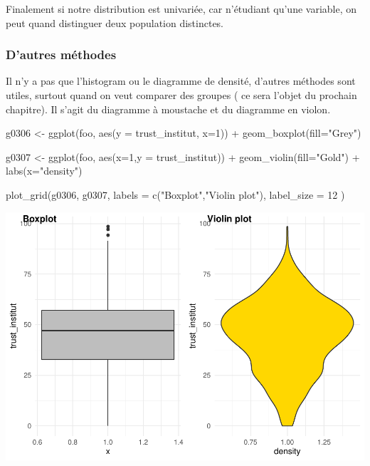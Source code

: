 \documentclass[
]{book}
\newenvironment{Shaded}{\begin{snugshade}}{\end{snugshade}}
\newcommand{\AttributeTok}[1]{\textcolor[rgb]{0.77,0.63,0.00}{#1}}
\newcommand{\DecValTok}[1]{\textcolor[rgb]{0.00,0.00,0.81}{#1}}
\newcommand{\FunctionTok}[1]{\textcolor[rgb]{0.00,0.00,0.00}{#1}}
\newcommand{\NormalTok}[1]{#1}
\newcommand{\OtherTok}[1]{\textcolor[rgb]{0.56,0.35,0.01}{#1}}
\newcommand{\SpecialCharTok}[1]{\textcolor[rgb]{0.00,0.00,0.00}{#1}}
\newcommand{\StringTok}[1]{\textcolor[rgb]{0.31,0.60,0.02}{#1}}
\begin{document}
Finalement si notre distribution est univariée, car n'étudiant qu'une variable, on peut quand distinguer deux population distinctes.

\hypertarget{dautres-muxe9thodes}{%
\subsubsection{D'autres méthodes}\label{dautres-muxe9thodes}}

Il n'y a pas que l'histogram ou le diagramme de densité, d'autres méthodes sont utiles, surtout quand on veut comparer des groupes ( ce sera l'objet du prochain chapitre). Il s'agit du diagramme à moustache et du diagramme en violon.

\begin{Shaded}
\begin{Highlighting}[]
\NormalTok{g0306 }\OtherTok{\textless{}{-}} \FunctionTok{ggplot}\NormalTok{(foo, }\FunctionTok{aes}\NormalTok{(}\AttributeTok{y =}\NormalTok{ trust\_institut, }\AttributeTok{x=}\DecValTok{1}\NormalTok{)) }\SpecialCharTok{+} 
\FunctionTok{geom\_boxplot}\NormalTok{(}\AttributeTok{fill=}\StringTok{"Grey"}\NormalTok{) }

\NormalTok{g0307 }\OtherTok{\textless{}{-}} \FunctionTok{ggplot}\NormalTok{(foo, }\FunctionTok{aes}\NormalTok{(}\AttributeTok{x=}\DecValTok{1}\NormalTok{,}\AttributeTok{y =}\NormalTok{ trust\_institut)) }\SpecialCharTok{+} 
\FunctionTok{geom\_violin}\NormalTok{(}\AttributeTok{fill=}\StringTok{"Gold"}\NormalTok{) }\SpecialCharTok{+} \FunctionTok{labs}\NormalTok{(}\AttributeTok{x=}\StringTok{"density"}\NormalTok{)}

\FunctionTok{plot\_grid}\NormalTok{(g0306, g0307, }\AttributeTok{labels =} \FunctionTok{c}\NormalTok{(}\StringTok{"Boxplot"}\NormalTok{,}\StringTok{"Violin plot"}\NormalTok{),}
  \AttributeTok{label\_size =} \DecValTok{12}
\NormalTok{)}
\end{Highlighting}
\end{Shaded}

\includegraphics{bookdown-demo_files/figure-latex/308a-1.pdf}
\end{document}
